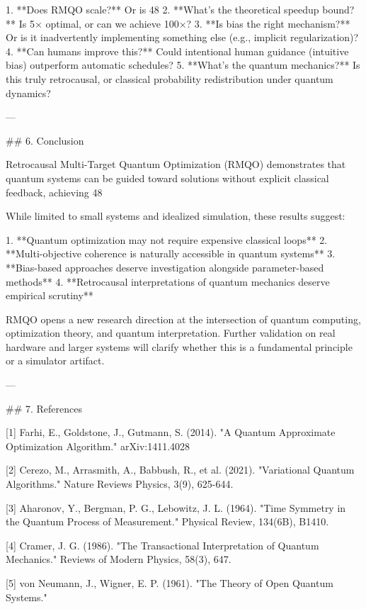 1. **Does RMQO scale?** Or is 48%
2. **What's the theoretical speedup bound?** Is 5× optimal, or can we achieve 100×?
3. **Is bias the right mechanism?** Or is it inadvertently implementing something else (e.g., implicit regularization)?
4. **Can humans improve this?** Could intentional human guidance (intuitive bias) outperform automatic schedules?
5. **What's the quantum mechanics?** Is this truly retrocausal, or classical probability redistribution under quantum dynamics?

---

## 6. Conclusion

Retrocausal Multi-Target Quantum Optimization (RMQO) demonstrates that quantum systems can be guided toward solutions without explicit classical feedback, achieving 48%

While limited to small systems and idealized simulation, these results suggest:

1. **Quantum optimization may not require expensive classical loops**
2. **Multi-objective coherence is naturally accessible in quantum systems**
3. **Bias-based approaches deserve investigation alongside parameter-based methods**
4. **Retrocausal interpretations of quantum mechanics deserve empirical scrutiny**

RMQO opens a new research direction at the intersection of quantum computing, optimization theory, and quantum interpretation. Further validation on real hardware and larger systems will clarify whether this is a fundamental principle or a simulator artifact.

---

## 7. References

[1] Farhi, E., Goldstone, J., Gutmann, S. (2014). "A Quantum Approximate Optimization Algorithm." arXiv:1411.4028

[2] Cerezo, M., Arrasmith, A., Babbush, R., et al. (2021). "Variational Quantum Algorithms." Nature Reviews Physics, 3(9), 625-644.

[3] Aharonov, Y., Bergman, P. G., Lebowitz, J. L. (1964). "Time Symmetry in the Quantum Process of Measurement." Physical Review, 134(6B), B1410.

[4] Cramer, J. G. (1986). "The Transactional Interpretation of Quantum Mechanics." Reviews of Modern Physics, 58(3), 647.

[5] von Neumann, J., Wigner, E. P. (1961). "The Theory of Open Quantum Systems."

